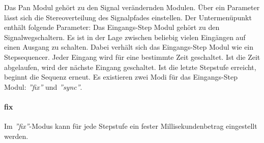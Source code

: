 Das Pan Modul gehört zu den Signal verändernden Modulen. Über ein Parameter lässt sich die Stereoverteilung des Signalpfades einstellen.
	Der Untermenüpunkt  enthält folgende Parameter:
		\bParameterlist
	\eParameterlist
Das Eingangs-Step Modul gehört zu den Signalwegschaltern. Es ist in der Lage zwischen beliebig vielen Eingängen auf einen Ausgang zu schalten. Dabei verhält sich das Eingangs-Step Modul wie ein Stepsequencer. Jeder Eingang wird für eine bestimmte Zeit geschaltet. Ist die Zeit abgelaufen, wird der nächste Eingang geschaltet. Ist die letzte Stepstufe erreicht, beginnt die Sequenz erneut. Es existieren zwei Modi für das Eingangs-Step Modul: \emph{''fix''} und \emph{''sync''}.\\
\paragraph{fix} Im \emph{''fix''}-Modus kann für jede Stepstufe ein fester Millisekundenbetrag eingestellt werden.
